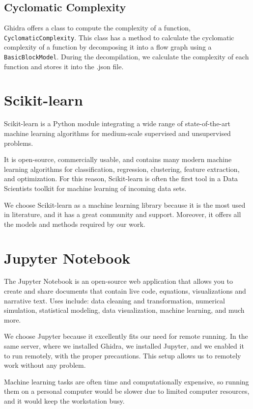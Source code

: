 \subsection{Cyclomatic Complexity}


Ghidra offers a class to compute the complexity of a function, \texttt{CyclomaticComplexity}. This class has a method to calculate the cyclomatic complexity of a function by decomposing it into a flow graph using a \texttt{BasicBlockModel}. During the decompilation, we calculate the complexity of each function and stores it into the .json file.


\section{Scikit-learn}
Scikit-learn \cite{scikit-learn} is a Python module integrating a wide range of state-of-the-art machine learning algorithms for medium-scale supervised and unsupervised problems. 

It is open-source, commercially usable, and contains many modern machine learning algorithms for classification, regression, clustering, feature extraction, and optimization.
For this reason, Scikit-learn is often the first tool in a Data Scientists toolkit for machine learning of incoming data sets. 

We choose Scikit-learn as a machine learning library because it is the most used in literature, and it has a great community and support. Moreover, it offers all the models and methods required by our work. 
\section{Jupyter Notebook}

The Jupyter Notebook  \cite{jupyter} is an open-source web application that allows you to create and share documents that contain live code, equations, visualizations and narrative text. Uses include: data cleaning and transformation, numerical simulation, statistical modeling, data visualization, machine learning, and much more.

We choose Jupyter because it excellently fits our need for remote running. In the same server, where we installed Ghidra, we installed Jupyter, and we enabled it to run remotely, with the proper precautions. This setup allows us to remotely work without any problem. 

Machine learning tasks are often time and computationally expensive, so running them on a personal computer would be slower due to limited computer resources, and it would keep the workstation busy.

